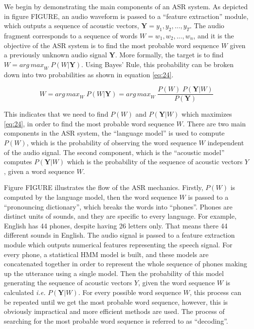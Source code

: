 
We begin by demonstrating the main components of an \ac{ASR} system. As depicted in figure FIGURE, an audio waveform is passed to a \enquote{feature extraction} module, which outputs a sequence of acoustic vectors, $\mathbf{Y} = y_1,y_2,...,y_T$. The audio fragment corresponds to a sequence of words $W = w_1,w_2,...,w_n$, and it is the objective of the \ac{ASR} system is to find the most probable word sequence $W$ given a previously unknown audio signal $\mathbf{Y}$.
More formally, the target is to find $W = {arg \, max}_{W} \; P(W|\mathbf{Y})$. Using Bayes' Rule, this probability can be broken down into two probabilities as shown in equation \ref{eq:24}.


\begin{equation}
\label{eq:24}
W = {arg \, max}_{W} \; P(W|\mathbf{Y}) = {arg \, max}_{W} \; \frac{P(W) \; P(\mathbf{Y}|W)}{P(\mathbf{Y})}
\end{equation}

This indicates that we need to find $P(W)$ and $P(\mathbf{Y}|W)$ which maximizes \ref{eq:24}, in order to find the most probable word sequence $W$.
There are two main components in the \ac{ASR} system, the \enquote{language model} is used to compute $P(W)$, which is the probability of observing the word sequence $W$ independent of the audio signal. The second component, which is the \enquote{acoustic model} computes $P(\mathbf{Y}|W)$ which is the probability of the sequence of acoustic vectors $Y$, given a word sequence $W$.

Figure FIGURE illustrates the flow of the \ac{ASR} mechanics. Firstly, $P(W)$ is computed by the language model, then the word sequence $W$ is passed to a \enquote{pronouncing dictionary}, which breaks the words into \enquote{phones}. Phones are distinct units of sounds, and they are specific to every language. For example, English has 44 phones, despite having 26 letters only. That means there 44 different sounds in English. The audio signal is passed to a feature extraction module which outputs numerical features representing the speech signal. For every phone, a statistical \ac{HMM} model is built, and these models are concatenated together in order to represent the whole sequence of phones making up the utterance using a single model. Then the probability of this model generating the sequence of acoustic vectors $Y$, given the word sequence $W$ is calculated \textit{i.e.} $P(\mathbf{Y}|W)$. For every possible word sequence $W$, this process can be repeated until we get the most probable word sequence, however, this is obviously impractical and more efficient methods are used. The process of searching for the most probable word sequence is referred to as \enquote{decoding}.

